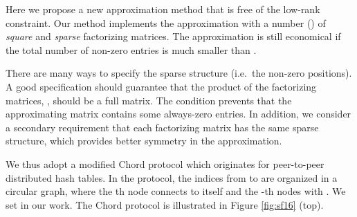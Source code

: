 \documentclass{article}
\begin{document}
Here we propose a new approximation method that is free of the low-rank constraint. Our method implements the approximation with a number () of \emph{square} and \emph{sparse} factorizing matrices. The approximation is still economical if the total number of non-zero entries is much smaller than .

There are many ways to specify the sparse structure (i.e.~the non-zero positions). A good specification should guarantee that the product of the factorizing matrices, , should be a full matrix. The condition prevents that the approximating matrix contains some always-zero entries. In addition, we consider a secondary requirement that each factorizing matrix has the same sparse structure, which provides better symmetry in the approximation.

We thus adopt a modified Chord protocol \citep{chord} which originates for peer-to-peer distributed hash tables. In the protocol, the indices from  to  are organized in a circular graph, where the th node connects to itself and the -th nodes with . We set  in our work. The Chord protocol is illustrated in Figure \ref{fig:sf16} (top).
\end{document}
